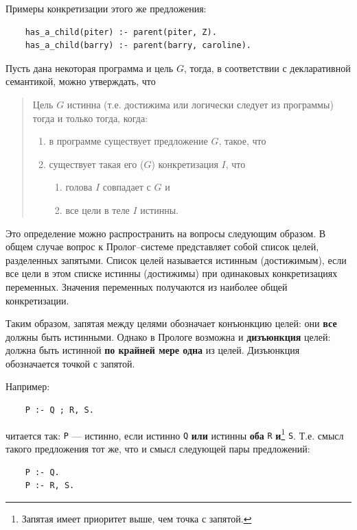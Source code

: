 \documentclass[12pt, openany, twoside]{book} %
\begin{document}
\noindent Примеры конкретизации этого же предложения:
{\tt\begin{verbatim}
    has_a_child(piter) :- parent(piter, Z).
    has_a_child(barry) :- parent(barry, caroline).
\end{verbatim}}

\noindent Пусть дана некоторая программа и цель $G$, тогда, в соответствии с декларативной семантикой, можно утверждать, что

\begin{quote}
\noindent Цель $G$ истинна (т.е. достижима или логически следует из программы) тогда и только тогда, когда:
\begin{enumerate}
    \item[(1)] в программе существует предложение $G$, такое, что
    \item[(2)] существует такая его ($G$) конкретизация $I$, что
    \begin{enumerate}
        \item[(а)] голова $I$ совпадает с $G$ и
        \item[(б)] все цели в теле $I$ истинны.
    \end{enumerate}
\end{enumerate}
\end{quote}

Это определение можно распространить на вопросы следующим образом. В общем случае вопрос к Пролог--системе представляет собой список целей, разделенных запятыми. Список целей называется истинным (достижимым), если все цели в этом списке истинны (достижимы) при одинаковых конкретизациях переменных. Значения переменных получаются из наиболее общей конкретизации.

Таким образом, запятая между целями обозначает конъюнкцию целей: они \textbf{все} должны быть истинными. Однако в Прологе возможна и \textbf{дизъюнкция} целей: должна быть истинной \textbf{по крайней мере одна} из целей. Дизъюнкция обозначается точкой с запятой.

Например:
{\tt\begin{verbatim}
    Р :- Q ; R, S.
\end{verbatim}}
\noindent читается так: {\tt Р} --- истинно, если истинно {\tt Q} \textbf{или} истинны {\bf оба} {\tt R} {\bf и}\footnote{Запятая имеет приоритет выше, чем точка с запятой.} {\tt S}. Т.е. смысл такого предложения тот же, что и смысл следующей пары предложений:

{\tt\begin{verbatim}
    Р :- Q.
    Р :- R, S.
\end{verbatim}}
\end{document}
